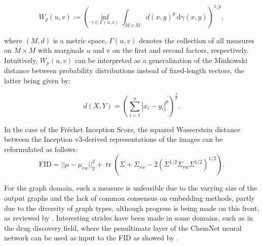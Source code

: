 \begin{equation}
  \label{eq:wasserstein_distance} W_p(u,v) := \left(\inf _{\gamma \in \Gamma
(u,v)}\int _{M\times M}d(x,y)^{p}\,\mathrm {d} \gamma (x,y)\right)^{1/p},
\end{equation}

where $(M, d)$ is a metric space, $\Gamma (u,v)$ denotes the collection of all
measures on $M\times M$ with marginals $u$ and $v$ on the first and second
factors, respectively. Intuitively, $W_p(u,v)$ can be interpreted as a
generalization of the Minkowski distance between probability distributions
instead of fixed-length vectors, the latter being given by:

\begin{equation}
  \label{eq:minkoski}
  d\left(X,Y\right)=\left(\sum _{i=1}^{n}|x_{i}-y_{i}|^{p}\right)^{\frac {1}{p}}.
\end{equation}

In the case of the Fr\'echet Inception Score, the squared Wasserstein distance
between the Inception v3-derived representations of the images can be
reformulated as follows:
\begin{equation}
  \label{eq:fid}
  \text{FID}=||\mu -\mu _{rw}||_{2}^{2}+\operatorname {tr} (\Sigma +\Sigma
_{rw}-2(\Sigma ^{1/2}\Sigma _{rw}\Sigma ^{1/2})^{1/2}).
\end{equation}

For the graph domain, such a measure is unfeasible due to the varying size of
the output graphs and the lack of common consensus on embedding methods, partly
due to the diversity of graph types, although progress is being made on this
front, as reviewed by \cite{xu2021understanding}. Interesting strides have been
made in some domains, such as in the drug discovery field, where the penultimate
layer of the ChemNet neural network can be used as input to the FID as showed by
\cite{preuer2018frechet}.

